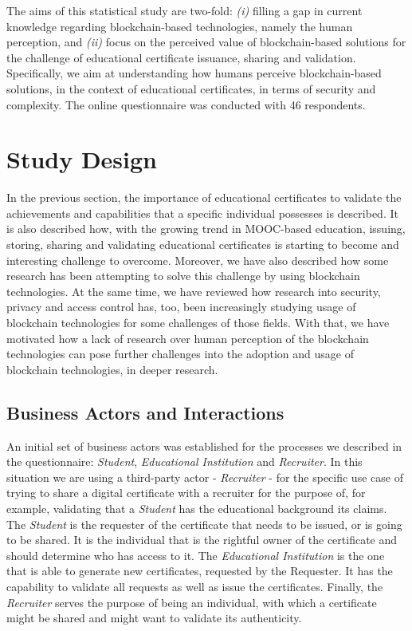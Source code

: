 The aims of this statistical study are two-fold: \emph{(i)} filling a gap in current knowledge regarding blockchain-based technologies, namely the human perception, and \emph{(ii)} focus on the perceived value of blockchain-based solutions for the challenge of educational certificate issuance, sharing and validation. Specifically, we aim at understanding how humans perceive blockchain-based solutions, in the context of educational certificates, in terms of security and complexity. The online questionnaire was conducted with 46 respondents.
  
\section{Study Design}

In the previous section, the importance of educational certificates to validate the achievements and capabilities that a specific individual possesses is described. It is also described how, with the growing trend in MOOC-based education, issuing, storing, sharing and validating educational certificates is starting to become and interesting challenge to overcome. Moreover, we have also described how some research has been attempting to solve this challenge by using blockchain technologies. At the same time, we have reviewed how research into security, privacy and access control has, too, been increasingly studying usage of blockchain technologies for some challenges of those fields. With that, we have motivated how a lack of research over human perception of the blockchain technologies can pose further challenges into the adoption and usage of blockchain technologies, in deeper research.
  
\subsection{Business Actors and Interactions}

An initial set of business actors was established for the processes we described in the questionnaire: \textit{Student}, \textit{Educational Institution} and \textit{Recruiter}. In this situation we are using a third-party actor - \textit{Recruiter} - for the specific use case of trying to share a digital certificate with a recruiter for the purpose of, for example, validating that a \textit{Student} has the educational background its claims. The \textit{Student} is the requester of the certificate that needs to be issued, or is going to be shared. It is the individual that is the rightful owner of the certificate and should determine who has access to it. The \textit{Educational Institution} is the one that is able to generate new certificates, requested by the Requester. It has the capability to validate all requests as well as issue the certificates. Finally, the \textit{Recruiter} serves the purpose of being an individual, with which a certificate might be shared and might want to validate its authenticity. 

